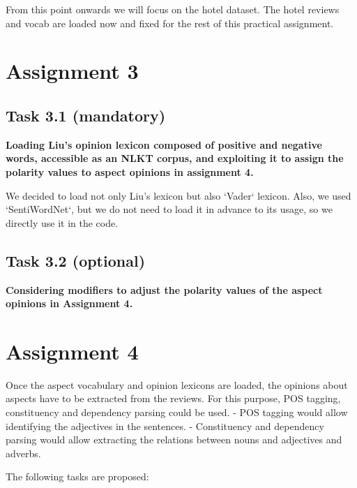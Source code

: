 \documentclass[11pt]{article}
\begin{document}
From this point onwards we will focus on the hotel dataset. The hotel
reviews and vocab are loaded now and fixed for the rest of this
practical assignment.



\hypertarget{assignment-3}{%
    \section{Assignment 3}\label{assignment-3}}

\hypertarget{task-3.1-mandatory}{%
    \subsection{Task 3.1 (mandatory)}\label{task-3.1-mandatory}}

\textbf{Loading Liu's opinion lexicon composed of positive and negative
    words, accessible as an NLKT corpus, and exploiting it to assign the
    polarity values to aspect opinions in assignment 4.}

We decided to load not only Liu's lexicon but also `Vader` lexicon. Also, we used `SentiWordNet`, but we do not need to load it in advance to its usage, so we directly use it in the code.


\hypertarget{task-3.2-optional}{%
    \subsection{Task 3.2 (optional)}\label{task-3.2-optional}}

\textbf{Considering modifiers to adjust the polarity values of the
    aspect opinions in Assignment 4.}


\hypertarget{assignment-4}{%
    \section{Assignment 4}\label{assignment-4}}

Once the aspect vocabulary and opinion lexicons are loaded, the opinions
about aspects have to be extracted from the reviews. For this purpose,
POS tagging, constituency and dependency parsing could be used. - POS
tagging would allow identifying the adjectives in the sentences. -
Constituency and dependency parsing would allow extracting the relations
between nouns and adjectives and adverbs.

The following tasks are proposed:
\end{document}
